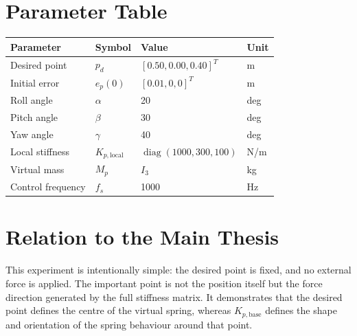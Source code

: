\section{Parameter Table}

\begin{center}
\renewcommand{\arraystretch}{1.3}
\begin{tabular}{@{}llll@{}}
\toprule
Parameter & Symbol & Value & Unit \\
\midrule
Desired point & \(p_d\) & \([0.50,0.00,0.40]^T\) & m \\
Initial error & \(e_p(0)\) & \([0.01,0,0]^T\) & m \\
Roll angle & \(\alpha\) & 20 & deg \\
Pitch angle & \(\beta\) & 30 & deg \\
Yaw angle & \(\gamma\) & 40 & deg \\
Local stiffness & \(K_{p,\mathrm{local}}\) & \(\operatorname{diag}(1000,300,100)\) & N/m \\
Virtual mass & \(M_p\) & \(I_3\) & kg \\
Control frequency & \(f_s\) & 1000 & Hz \\
\bottomrule
\end{tabular}
\end{center}

\section{Relation to the Main Thesis}

This experiment is intentionally simple: the desired point is fixed, and no
external force is applied. The important point is not the position itself but
the force direction generated by the full stiffness matrix. It demonstrates
that the desired point defines the centre of the virtual spring, whereas
\(K_{p,\mathrm{base}}\) defines the shape and orientation of the
spring behaviour around that point.
